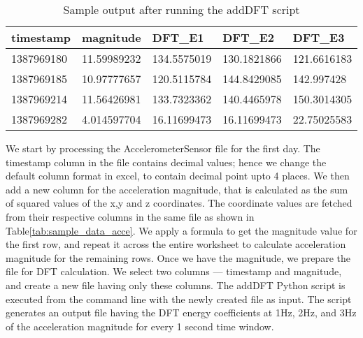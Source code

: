 \begin{table}[h]
	\centering	
	\caption{Sample output after running the addDFT script\label{tab:sample_acce_dft}}
  	\begin{tabular}{ | p{1.1cm} | p{1.3cm} | p{1.4cm} | p{1.4cm} | p{1.4cm} | }
    	\hline
	    \textbf{timestamp} & \textbf{magnitude} & \textbf{DFT\_E1} & \textbf{DFT\_E2} & \textbf{DFT\_E3} \\ \hline
		1387969180 & 11.59989232 & 134.5575019 & 130.1821866 & 121.6616183 \\ \hline
		1387969185 & 10.97777657 & 120.5115784 & 144.8429085 & 142.997428 \\ \hline
		1387969214 & 11.56426981 & 133.7323362 & 140.4465978 & 150.3014305 \\ \hline
		1387969282 & 4.014597704 & 16.11699473 & 16.11699473 & 22.75025583 \\
	    \hline
  	\end{tabular}
\end{table}

We start by processing the AccelerometerSensor file for the first day. The timestamp column in the file contains decimal values; hence we change the default column format in excel, to contain decimal point upto 4 places. We then add a new column for the acceleration magnitude, that is calculated as the sum of squared values of the x,y and z coordinates. The coordinate values are fetched from their respective columns in the same file as shown in Table\ref{tab:sample_data_acce}. We apply a formula to get the magnitude value for the first row, and repeat it across the entire worksheet to calculate acceleration magnitude for the remaining rows. Once we have the magnitude, we prepare the file for DFT calculation. We select two columns --- timestamp and magnitude, and create a new file having only these columns. The addDFT Python script is executed from the command line with the newly created file as input. The script generates an output file having the DFT energy coefficients at 1Hz, 2Hz, and 3Hz of the acceleration magnitude for every 1 second time window.


